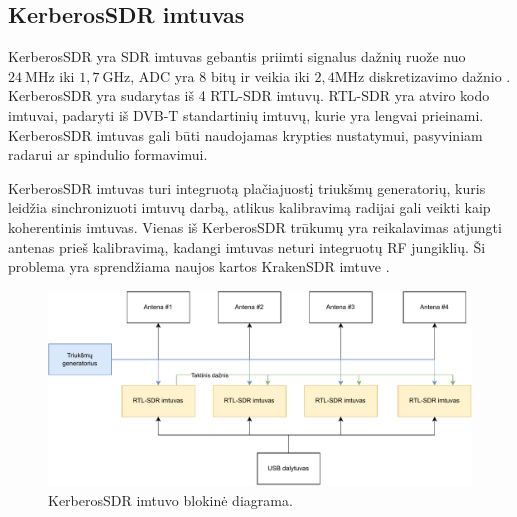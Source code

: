 \documentclass[main.tex]{subfiles}
\begin{document}
\subsection{KerberosSDR imtuvas}\label{sec:kerberossdr}

KerberosSDR yra SDR imtuvas gebantis priimti signalus dažnių ruože nuo $24\ \mathrm{MHz}$
iki $1,7\ \mathrm{GHz}$, ADC yra 8 bitų ir veikia iki $2,4 \mathrm{MHz}$ diskretizavimo dažnio
\cite{kerberossdr}.
KerberosSDR yra sudarytas iš 4 RTL-SDR imtuvų. RTL-SDR yra atviro kodo imtuvai, padaryti iš
DVB-T standartinių imtuvų, kurie yra lengvai prieinami. KerberosSDR imtuvas
gali būti naudojamas krypties nustatymui, pasyviniam radarui ar spindulio formavimui.

KerberosSDR imtuvas turi integruotą plačiajuostį triukšmų generatorių, kuris leidžia
sin\-chro\-ni\-zuo\-ti imtuvų darbą, atlikus kalibravimą radijai gali veikti kaip koherentinis imtuvas.
Vienas iš KerberosSDR trūkumų yra reikalavimas atjungti antenas prieš kalibravimą, kadangi
imtuvas neturi integruotų RF jungiklių. Ši problema yra sprendžiama naujos kartos KrakenSDR
imtuve \cite{krakensdr}.

\begin{figure}[h]
    \begin{centering}
    \includegraphics[scale=0.8]{drawings/kerberos_sdr_blockdiagram}
    \par\end{centering}
    \protect\caption{\label{fig:kerberos_block}KerberosSDR imtuvo blokinė diagrama.}
\end{figure}
\end{document}

